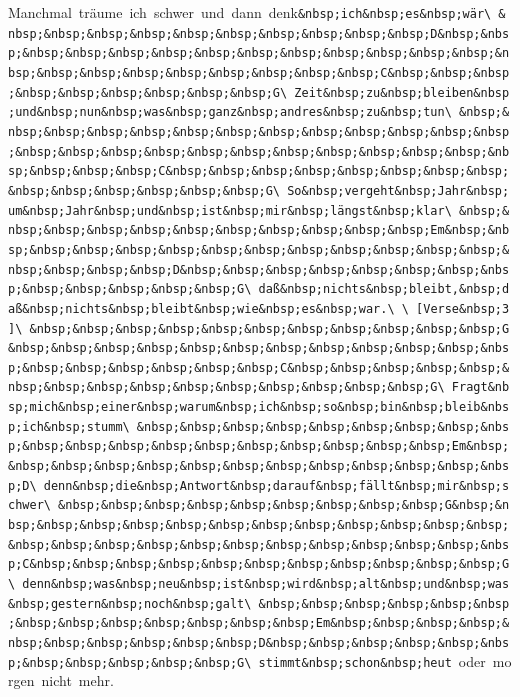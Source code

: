 \documentclass[]{book}
\begin{document}
Manchmal~träume~ich~schwer~und~dann~denk\texttt{\&nbsp;ich\&nbsp;es\&nbsp;wär\textbackslash{}\ \&nbsp;\&nbsp;\&nbsp;\&nbsp;\&nbsp;\&nbsp;\&nbsp;\&nbsp;\&nbsp;\&nbsp;D\&nbsp;\&nbsp;\&nbsp;\&nbsp;\&nbsp;\&nbsp;\&nbsp;\&nbsp;\&nbsp;\&nbsp;\&nbsp;\&nbsp;\&nbsp;\&nbsp;\&nbsp;\&nbsp;\&nbsp;\&nbsp;\&nbsp;\&nbsp;\&nbsp;\&nbsp;C\&nbsp;\&nbsp;\&nbsp;\&nbsp;\&nbsp;\&nbsp;\&nbsp;\&nbsp;\&nbsp;G\textbackslash{}\ Zeit\&nbsp;zu\&nbsp;bleiben\&nbsp;und\&nbsp;nun\&nbsp;was\&nbsp;ganz\&nbsp;andres\&nbsp;zu\&nbsp;tun\textbackslash{}\ \&nbsp;\&nbsp;\&nbsp;\&nbsp;\&nbsp;\&nbsp;\&nbsp;\&nbsp;\&nbsp;\&nbsp;\&nbsp;\&nbsp;\&nbsp;\&nbsp;\&nbsp;\&nbsp;\&nbsp;\&nbsp;\&nbsp;\&nbsp;\&nbsp;\&nbsp;\&nbsp;\&nbsp;\&nbsp;\&nbsp;\&nbsp;\&nbsp;C\&nbsp;\&nbsp;\&nbsp;\&nbsp;\&nbsp;\&nbsp;\&nbsp;\&nbsp;\&nbsp;\&nbsp;\&nbsp;\&nbsp;\&nbsp;\&nbsp;G\textbackslash{}\ So\&nbsp;vergeht\&nbsp;Jahr\&nbsp;um\&nbsp;Jahr\&nbsp;und\&nbsp;ist\&nbsp;mir\&nbsp;längst\&nbsp;klar\textbackslash{}\ \&nbsp;\&nbsp;\&nbsp;\&nbsp;\&nbsp;\&nbsp;\&nbsp;\&nbsp;\&nbsp;\&nbsp;\&nbsp;Em\&nbsp;\&nbsp;\&nbsp;\&nbsp;\&nbsp;\&nbsp;\&nbsp;\&nbsp;\&nbsp;\&nbsp;\&nbsp;\&nbsp;\&nbsp;\&nbsp;\&nbsp;\&nbsp;\&nbsp;D\&nbsp;\&nbsp;\&nbsp;\&nbsp;\&nbsp;\&nbsp;\&nbsp;\&nbsp;\&nbsp;\&nbsp;\&nbsp;\&nbsp;\&nbsp;G\textbackslash{}\ daß\&nbsp;nichts\&nbsp;bleibt,\&nbsp;daß\&nbsp;nichts\&nbsp;bleibt\&nbsp;wie\&nbsp;es\&nbsp;war.\textbackslash{}\ \textbackslash{}\ {[}Verse\&nbsp;3{]}\textbackslash{}\ \&nbsp;\&nbsp;\&nbsp;\&nbsp;\&nbsp;\&nbsp;\&nbsp;\&nbsp;\&nbsp;\&nbsp;\&nbsp;G\&nbsp;\&nbsp;\&nbsp;\&nbsp;\&nbsp;\&nbsp;\&nbsp;\&nbsp;\&nbsp;\&nbsp;\&nbsp;\&nbsp;\&nbsp;\&nbsp;\&nbsp;\&nbsp;\&nbsp;\&nbsp;C\&nbsp;\&nbsp;\&nbsp;\&nbsp;\&nbsp;\&nbsp;\&nbsp;\&nbsp;\&nbsp;\&nbsp;\&nbsp;\&nbsp;\&nbsp;\&nbsp;\&nbsp;G\textbackslash{}\ Fragt\&nbsp;mich\&nbsp;einer\&nbsp;warum\&nbsp;ich\&nbsp;so\&nbsp;bin\&nbsp;bleib\&nbsp;ich\&nbsp;stumm\textbackslash{}\ \&nbsp;\&nbsp;\&nbsp;\&nbsp;\&nbsp;\&nbsp;\&nbsp;\&nbsp;\&nbsp;\&nbsp;\&nbsp;\&nbsp;\&nbsp;\&nbsp;\&nbsp;\&nbsp;\&nbsp;\&nbsp;\&nbsp;Em\&nbsp;\&nbsp;\&nbsp;\&nbsp;\&nbsp;\&nbsp;\&nbsp;\&nbsp;\&nbsp;\&nbsp;\&nbsp;\&nbsp;\&nbsp;D\textbackslash{}\ denn\&nbsp;die\&nbsp;Antwort\&nbsp;darauf\&nbsp;fällt\&nbsp;mir\&nbsp;schwer\textbackslash{}\ \&nbsp;\&nbsp;\&nbsp;\&nbsp;\&nbsp;\&nbsp;\&nbsp;\&nbsp;\&nbsp;G\&nbsp;\&nbsp;\&nbsp;\&nbsp;\&nbsp;\&nbsp;\&nbsp;\&nbsp;\&nbsp;\&nbsp;\&nbsp;\&nbsp;\&nbsp;\&nbsp;\&nbsp;\&nbsp;\&nbsp;\&nbsp;\&nbsp;\&nbsp;\&nbsp;\&nbsp;\&nbsp;\&nbsp;\&nbsp;C\&nbsp;\&nbsp;\&nbsp;\&nbsp;\&nbsp;\&nbsp;\&nbsp;\&nbsp;\&nbsp;\&nbsp;\&nbsp;G\textbackslash{}\ denn\&nbsp;was\&nbsp;neu\&nbsp;ist\&nbsp;wird\&nbsp;alt\&nbsp;und\&nbsp;was\&nbsp;gestern\&nbsp;noch\&nbsp;galt\textbackslash{}\ \&nbsp;\&nbsp;\&nbsp;\&nbsp;\&nbsp;\&nbsp;\&nbsp;\&nbsp;\&nbsp;\&nbsp;\&nbsp;\&nbsp;\&nbsp;Em\&nbsp;\&nbsp;\&nbsp;\&nbsp;\&nbsp;\&nbsp;\&nbsp;\&nbsp;\&nbsp;\&nbsp;D\&nbsp;\&nbsp;\&nbsp;\&nbsp;\&nbsp;\&nbsp;\&nbsp;\&nbsp;\&nbsp;\&nbsp;\&nbsp;G\textbackslash{}\ stimmt\&nbsp;schon\&nbsp;heut}~oder~morgen~nicht~mehr.\\
\end{document}
